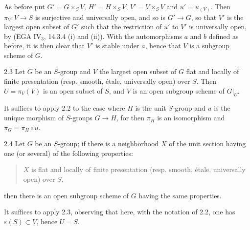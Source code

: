 As before put $G'=G\times_SV$, $H'=H\times_SV$, $V'=V\times_SV$ and $u'=u_{(V)}$. Then $\pi_V:V\to S$ is surjective and universally open, and so is $G'\to G$, so that $V'$ is the largest open subset of $G'$ such that the restriction of $u'$ to $V'$ is universally open, by (EGA IV$_3$, 14.3.4 (i) and (ii)). With the automorphisms $a$ and $b$ defined as before, it is then clear that $V'$ is stable under $a$, hence that $V$ is a subgroup scheme of $G$.
\begin{corollary}{2.3}\label{VIB.2.3}
Let $G$ be an $S$-group and $V$ the largest open subset of $G$ flat and locally of finite presentation (resp. smooth, étale, universally open) over $S$. Then $U=\pi_V(V)$ is an open subset of $S$, and $V$ is an open subgroup scheme of $G|_U$.
\end{corollary}
It suffices to apply 2.2 to the case where $H$ is the unit $S$-group and $u$ is the unique morphism of $S$-groups $G\to H$, for then $\pi_H$ is an isomorphism and $\pi_G=\pi_H\circ u$.
\begin{corollary}{2.4}\label{VIB.2.4}
Let $G$ be an $S$-group; if there is a neighborhood $X$ of the unit section having one (or several) of the following properties:
\begin{quote}
$X$ is flat and locally of finite presentation (resp. smooth, étale, universally open) over $S$,
\end{quote}
then there is an open subgroup scheme of $G$ having the same properties.
\end{corollary}
It suffices to apply 2.3, observing that here, with the notation of 2.2, one has $\varepsilon(S)\subset V$, hence $U=S$.
